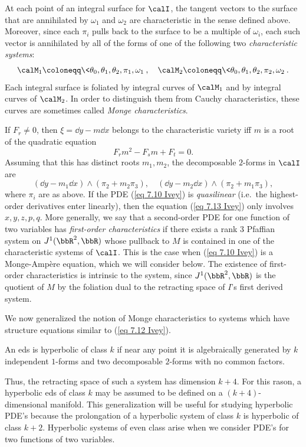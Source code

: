 At each point of an integral surface for $\calI$, the tangent vectors to the surface that are annihilated by $\omega_1$ and $\omega_2$ are characteristic in the sense defined above. Moreover, since each $\pi_i$ pulls back to the surface to be a multiple of $\omega_i$, each such vector is annihilated by all of the forms of one of the following two \emph{characteristic systems}:
\[\calM_1\coloneqq \<\theta_0,\theta_1,\theta_2,\pi_1,\omega_1\>,\quad \calM_2\coloneqq \<\theta_0,\theta_1,\theta_2,\pi_2,\omega_2\>.\]
Each integral surface is foliated by integral curves of $\calM_1$ and by integral curves of $\calM_2$. In order to distinguish them from Cauchy characteristics, these curves are sometimes called \emph{Monge characteristics}.

\begin{rem}
    If $F_r\neq 0$, then $\xi=\dd y-m\dd x$ belongs to the characteristic variety iff $m$ is a root of the quadratic equation 
    \[F_rm^2-F_sm+F_t=0.\label{eq 7.13 Ivey}\]
    Assuming that this has distinct roots $m_1,m_2$, the decomposable $2$-forms in $\calI$ are 
    \[(\dd y-m_1\dd x)\wedge (\pi_2+m_2\pi_3),\quad (\dd y-m_2\dd x)\wedge (\pi_2+m_1\pi_3),\]
    where $\pi_i$ are as above.
    If the PDE (\ref{eq 7.10 Ivey}) is \emph{quasilinear} (i.e.\ the highest-order derivatives enter linearly), then the equation (\ref{eq 7.13 Ivey}) only involves $x,y,z,p,q$. More generally, we say that a second-order PDE for one function of two variables has \emph{first-order characteristics} if there exists a rank $3$ Pfaffian system on $J^1(\bbR^2,\bbR)$ whose pullback to $M$ is contained in one of the characteristic systems of $\calI$. This is the case when (\ref{eq 7.10 Ivey}) is a Monge-Amp\`ere equation, which we will consider below. The existence of first-order characteristics is intrinsic to the system, since $J^1(\bbR^2,\bbR)$ is the quotient of $M$ by the foliation dual to the retracting space of $I$'s first derived system.
\end{rem}
We now generalized the notion of Monge characteristics to systems which have structure equations similar to (\ref{eq 7.12 Ivey}).

\begin{defn}
    An \gls{eds} is hyperbolic of class $k$ if near any point it is algebraically generated by $k$ independent $1$-forms and two decomposable $2$-forms with no common factors.
\end{defn}

Thus, the retracting space of such a system has dimension $k+4$. For this rason, a hyperbolic \gls{eds} of class $k$ may be assumed to be defined on a $(k+4)$-dimensional manifold. This generalization will be useful for studying hyperbolic PDE's because the prolongation of a hyperbolic system of class $k$ is hyperbolic of class $k+2$. Hyperbolic systems of even class arise when we consider PDE's for two functions of two variables.









